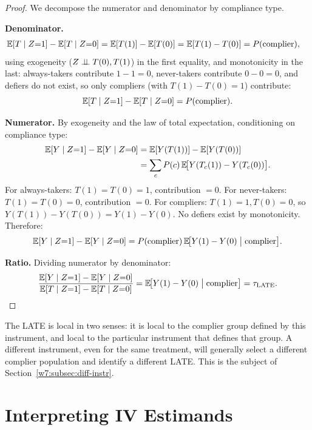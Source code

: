 \documentclass[master.tex]{subfiles}
\begin{document}
\begin{proof}
We decompose the numerator and denominator by compliance type.

\medskip\noindent\textbf{Denominator.}
\begin{align*}
  \mathbb{E}[T \mid Z{=}1] - \mathbb{E}[T \mid Z{=}0]
  &= \mathbb{E}[T(1)] - \mathbb{E}[T(0)]
   = \mathbb{E}[T(1) - T(0)]
   = P(\text{complier}),
\end{align*}
using exogeneity ($Z \perp\!\!\!\perp T(0), T(1)$) in the first equality,
and monotonicity in the last: always-takers contribute $1 - 1 = 0$,
never-takers contribute $0 - 0 = 0$, and defiers do not exist,
so only compliers (with $T(1) - T(0) = 1$) contribute:
\[
  \mathbb{E}[T \mid Z{=}1] - \mathbb{E}[T \mid Z{=}0] = P(\text{complier}).
\]

\medskip\noindent\textbf{Numerator.}  By exogeneity and the law
of total expectation, conditioning on compliance type:
\begin{align*}
  \mathbb{E}[Y \mid Z{=}1] - \mathbb{E}[Y \mid Z{=}0]
  &= \mathbb{E}[Y(T(1))] - \mathbb{E}[Y(T(0))] \\
  &= \sum_{c} P(c)\,
     \mathbb{E}\!\bigl[Y(T_c(1)) - Y(T_c(0))\bigr].
\end{align*}
For always-takers: $T(1) = T(0) = 1$, contribution $= 0$.
For never-takers: $T(1) = T(0) = 0$, contribution $= 0$.
For compliers: $T(1) = 1, T(0) = 0$, so
$Y(T(1)) - Y(T(0)) = Y(1) - Y(0)$.
No defiers exist by monotonicity.  Therefore:
\[
  \mathbb{E}[Y \mid Z{=}1] - \mathbb{E}[Y \mid Z{=}0]
  = P(\text{complier})\,
    \mathbb{E}\!\bigl[Y(1) - Y(0) \;\big|\; \text{complier}\bigr].
\]

\medskip\noindent\textbf{Ratio.}  Dividing numerator by denominator:
\[
  \frac{\mathbb{E}[Y \mid Z{=}1] - \mathbb{E}[Y \mid Z{=}0]}
       {\mathbb{E}[T \mid Z{=}1] - \mathbb{E}[T \mid Z{=}0]}
  = \mathbb{E}\!\bigl[Y(1) - Y(0) \;\big|\; \text{complier}\bigr]
  = \tau_{\mathrm{LATE}}. 
\]
\end{proof}

\begin{remark}
The LATE is local in two senses: it is local to the complier group
defined by this instrument, and local to the particular instrument
that defines that group.  A different instrument, even for the same
treatment, will generally select a different complier population and
identify a different LATE.  This is the subject of
Section~\ref{w7:subsec:diff-instr}.
\end{remark}


\section{Interpreting IV Estimands}
\label{w7:sec:interpret}
\end{document}
